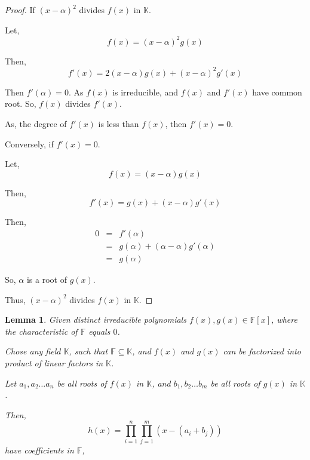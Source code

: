 \documentclass{article}
\newtheorem{lemma}{Lemma}[section]
\begin{document}
    \begin{proof}
        If $ (x-\alpha)^2 $ divides $ f(x) $ in $ \mathbb{K} $.

        Let,
        \begin{equation*}
            f(x) = (x-\alpha)^{2}g(x)
        \end{equation*}

        Then,
        \begin{equation*}
            f'(x) = 2(x-\alpha)g(x) + (x-\alpha)^{2}g'(x)
        \end{equation*}

        Then $ f'(\alpha) = 0 $.
        As $ f(x) $ is irreducible,
        and $ f(x) $ and $ f'(x) $ have common root.
        So, $ f(x) $ divides $f'(x)$.

        As, the degree of $ f'(x) $ is less than $ f(x) $,
        then $ f'(x) = 0 $.

        Conversely, if $ f'(x) = 0 $.

        Let,
        \begin{equation*}
            f(x) = (x-\alpha)g(x)
        \end{equation*}

        Then,
        \begin{equation*}
            f'(x) = g(x) + (x-\alpha)g'(x)
        \end{equation*}

        Then,
        \begin{eqnarray*}
            0 & = & f'(\alpha) \\
            & = & g(\alpha) + (\alpha-\alpha)g'(\alpha) \\
            & = & g(\alpha)
        \end{eqnarray*}

        So, $ \alpha $ is a root of $ g(x) $.

        Thus, $ (x-\alpha)^2 $ divides $ f(x) $ in $ \mathbb{K} $.
    \end{proof}

    \begin{lemma}
        Given distinct irreducible polynomials $ f(x), g(x) \in \mathbb{F}[x] $,
        where the characteristic of $ \mathbb{F} $ equals $ 0 $.

        Chose any field $ \mathbb{K} $, such that $ \mathbb{F} \subseteq \mathbb{K} $,
        and $ f(x) $ and $ g(x) $ can be factorized into product of linear factors in $ \mathbb{K} $.

        Let $ a_{1}, a_{2} \dots a_{n} $ be all roots of $ f(x) $ in $ \mathbb{K} $,
        and $ b_{1}, b_{2} \dots b_{m} $ be all roots of $ g(x) $ in $ \mathbb{K} $.

        Then,
        \begin{equation*}
            h(x) = \prod_{i=1}^{n}\prod_{j=1}^{m}(x-(a_{i} + b_{j}))
        \end{equation*}
        have coefficients in $ \mathbb{F} $,
    \end{lemma}
\end{document}
